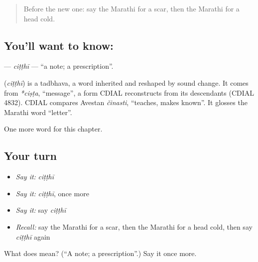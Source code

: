 \label{lesson:MR-C200-citthi}



\begin{quote}
Before the new one: say the Marathi for a scar, then the Marathi for a head cold.
\end{quote}

\subsection*{You'll want to know: }
\textbf{} — \emph{ciṭṭhī} — \textquotedblleft{}a note; a prescription\textquotedblright{}.

\begin{cousinweb}
\textbf{} (\emph{ciṭṭhī}) is a tadbhava, a word inherited and reshaped by sound change. It comes from \emph{*ciṣṭa}, \textquotedblleft{}message\textquotedblright{}, a form CDIAL reconstructs from its descendants (CDIAL 4832). CDIAL compares Avestan \emph{činasti}, \textquotedblleft{}teaches, makes known\textquotedblright{}. It glosses the Marathi word \textquotedblleft{}letter\textquotedblright{}.
\end{cousinweb}

\begin{grammarlens}[title={What you've built}]
One more word for this chapter.
\end{grammarlens}

\subsection*{Your turn}
\begin{itemize}
\raggedright
  \item \emph{Say it:} \emph{ciṭṭhī}
  \item \emph{Say it:} \emph{ciṭṭhī}, once more
  \item \emph{Say it:} say \emph{ciṭṭhī}
  \item \emph{Recall:} say the Marathi for a scar, then the Marathi for a head cold, then say \emph{ciṭṭhī} again
\end{itemize}

\begin{tcolorbox}[breakable,colback=teal!4,colframe=teal!35!black,title={Before you move on}]
What does  mean? (\textquotedblleft{}A note; a prescription\textquotedblright{}.) Say it once more.
\end{tcolorbox}

